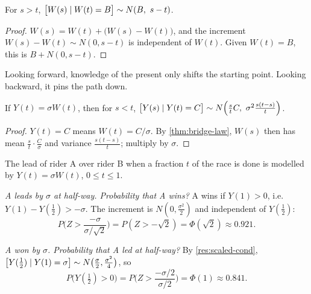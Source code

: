 \begin{result}[$W(s)$ given $W(t)=B$, for $s>t$]
\label{res:after}
For $s>t$, $\big[W(s)\given W(t)=B\big]\sim N(B,\ s-t)$.
\end{result}
\begin{proof}
$W(s)=W(t)+\big(W(s)-W(t)\big)$, and the increment $W(s)-W(t)\sim N(0,s-t)$ is independent of $W(t)$. Given $W(t)=B$, this is $B+N(0,s-t)$.
\end{proof}

Looking forward, knowledge of the present only shifts the starting point. Looking backward, it pins the path down.

\begin{result}
\label{res:scaled-cond}
If $Y(t)=\sigma W(t)$, then for $s<t$, $\big[Y(s)\mid Y(t)=C\big]\sim N\Big(\frac stC,\ \sigma^2\frac{s(t-s)}{t}\Big)$.
\end{result}
\begin{proof}
$Y(t)=C$ means $W(t)=C/\sigma$. By \cref{thm:bridge-law}, $W(s)$ then has mean $\frac st\cdot\frac C\sigma$ and variance $\frac{s(t-s)}{t}$; multiply by $\sigma$.
\end{proof}

\begin{example}
\label{ex:race}
The lead of rider A over rider B when a fraction $t$ of the race is done is modelled by $Y(t)=\sigma W(t)$, $0\le t\le1$.
\begin{steps}
  \item \emph{A leads by $\sigma$ at half-way. Probability that A wins?} A wins if $Y(1)>0$, i.e.\ $Y(1)-Y(\frac12)>-\sigma$. The increment is $N(0,\frac{\sigma^2}{2})$ and independent of $Y(\frac12)$:
  \[
    P\Big(Z>\frac{-\sigma}{\sigma/\sqrt2}\Big)=P(Z>-\sqrt2)=\Phi(\sqrt2)\approx0.921 .
  \]
  \item \emph{A won by $\sigma$. Probability that A led at half-way?} By \cref{res:scaled-cond}, $\big[Y(\frac12)\mid Y(1)=\sigma\big]\sim N\big(\frac\sigma2,\frac{\sigma^2}{4}\big)$, so
  \[
    P\Big(Y(\tfrac12)>0\Big)=P\Big(Z>\frac{-\sigma/2}{\sigma/2}\Big)=\Phi(1)\approx0.841 .
  \]
\end{steps}
\end{example}
